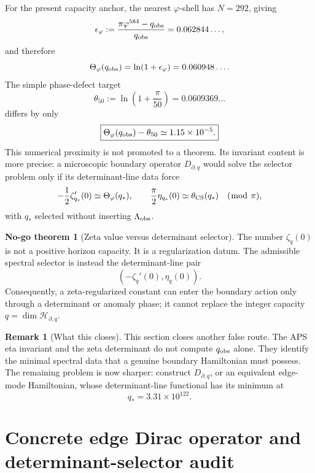 \documentclass[aps,prd,reprint,nofootinbib,superscriptaddress,floatfix]{revtex4-2}
\numberwithin{equation}{section}
\theoremstyle{definition}
\newtheorem{remark}{Remark}[section]
\newtheorem{nogotheorem}{No-go theorem}[section]
\theoremstyle{plain}
\begin{document}
For the present capacity anchor, the nearest \(\varphi\)-shell has
\(N=292\), giving
\begin{equation}
\epsilon_\varphi
:=
\frac{\pi\varphi^{584}-q_{\rm obs}}{q_{\rm obs}}
=0.062844\ldots,
\end{equation}
and therefore
\begin{equation}
\Theta_\varphi(q_{\rm obs})
=
\ln(1+\epsilon_\varphi)
=
0.060948\ldots .
\end{equation}
The simple phase-defect target
\begin{equation}
\theta_{50}:=\ln\!\left(1+\frac{\pi}{50}\right)
=0.0609369\ldots
\end{equation}
differs by only
\begin{equation}
\boxed{
\Theta_\varphi(q_{\rm obs})-\theta_{50}
\simeq 1.15\times10^{-5}.
}
\end{equation}
This numerical proximity is not promoted to a theorem.  Its invariant
content is more precise: a microscopic boundary operator \(D_{\partial,q}\)
would solve the selector problem only if its determinant-line data force
\[
-\frac12\zeta_{q_*}'(0)\simeq\Theta_\varphi(q_*),
\qquad
\frac{\pi}{2}\eta_{q_*}(0)\simeq \theta_{\rm CS}(q_*)
\quad(\bmod\ \pi),
\]
with \(q_*\) selected without inserting \(\Lambda_{\rm obs}\).

\begin{nogotheorem}[Zeta value versus determinant selector]
The number \(\zeta_q(0)\) is not a positive horizon capacity.  It is a
regularization datum.  The admissible spectral selector is instead the
determinant-line pair
\[
\left(-\zeta_q'(0),\eta_q(0)\right).
\]
Consequently, a zeta-regularized constant can enter the boundary action
only through a determinant or anomaly phase; it cannot replace the
integer capacity \(q=\dim\mathcal H_{\partial,q}\).
\end{nogotheorem}

\begin{remark}[What this closes]
This section closes another false route.  The APS eta invariant and the
zeta determinant do not compute \(q_{\rm obs}\) alone.  They identify the
minimal spectral data that a genuine boundary Hamiltonian must possess.
The remaining problem is now sharper: construct \(D_{\partial,q}\), or an
equivalent edge-mode Hamiltonian, whose determinant-line functional has
its minimum at
\[
q_*=3.31\times10^{122}.
\]
\end{remark}


\section{Concrete edge Dirac operator and determinant-selector audit}
\label{sec:concrete-edge-dirac}
\end{document}
